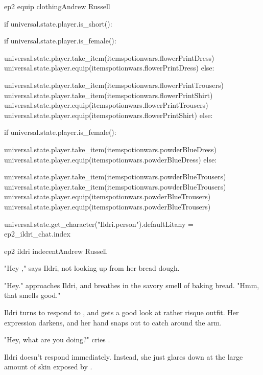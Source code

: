 \documentclass{book}
\begin{document}
\begin{childnode}{ep2 equip clothing}{Andrew Russell}
\begin{code}

    if universal.state.player.is_short():

        if universal.state.player.is_female():

            universal.state.player.take_item(itemspotionwars.flowerPrintDress)
            universal.state.player.equip(itemspotionwars.flowerPrintDress)
        else: 

            universal.state.player.take_item(itemspotionwars.flowerPrintTrousers)
            universal.state.player.take_item(itemspotionwars.flowerPrintShirt)
            universal.state.player.equip(itemspotionwars.flowerPrintTrousers)
            universal.state.player.equip(itemspotionwars.flowerPrintShirt)
    else:

        if universal.state.player.is_female():

            universal.state.player.take_item(itemspotionwars.powderBlueDress)
            universal.state.player.equip(itemspotionwars.powderBlueDress)
        else: 

            universal.state.player.take_item(itemspotionwars.powderBlueTrousers)
            universal.state.player.take_item(itemspotionwars.powderBlueTrousers)
            universal.state.player.equip(itemspotionwars.powderBlueTrousers)
            universal.state.player.equip(itemspotionwars.powderBlueTrousers)

    universal.state.get_character("Ildri.person").defaultLitany = ep2_ildri_chat.index
\end{code}

\end{childnode}

\begin{childnode}{ep2 ildri indecent}{Andrew Russell}


    "Hey \nickname{}," says Ildri, not looking up from her bread dough.

    "Hey." \name{} approaches Ildri, and breathes in the savory smell of baking bread. "Hmm, that smells good."

    Ildri turns to respond to \name{}, and gets a good look at \names{} rather risque outfit. Her expression darkens, and her hand snaps out to catch \name{} around the arm.
    
    "Hey, what are you doing?" cries \name{}.

    Ildri doesn't respond immediately. Instead, she just glares down at the large amount of skin exposed by \names{} .


\end{childnode}
\end{document}
